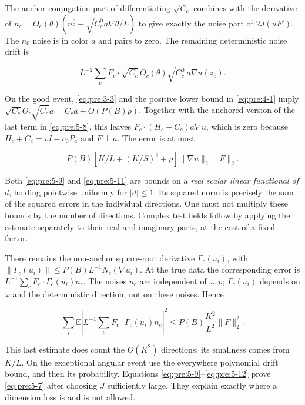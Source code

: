 The anchor-conjugation part of differentiating \(\sqrt{C_c}\) combines with the derivative of \(n_c=O_c(\theta)(n_c^0+\sqrt{C_c^0}a\nabla\theta/L)\) to give exactly the noise part of \(2J(uF')\). The \(n_0\) noise is in color \(a\) and pairs to zero. The remaining deterministic noise drift is

\begin{equation}
L^{-2}\sum_c F_c\cdot\sqrt{C_c}\,O_c(\theta)\sqrt{C_c^0}\,a\nabla u(z_c).
\label{eq:pre:5-10}
\end{equation}

On the good event, \eqref{eq:pre:3-3} and the positive lower bound in \eqref{eq:pre:4-1} imply
\(\sqrt{C_c}O_c\sqrt{C_c^0}a=C_ca+O(P(B)\rho)\).
Together with the anchored version of the last term in \eqref{eq:pre:5-8}, this leaves \(F_c\cdot(H_c+C_c)a\nabla u\), which is zero because \(H_c+C_c=vI-c_0P_a\) and \(F\perp a\). The error is at most

\begin{equation}
P(B)[K/L+(K/S)^2+\rho]\|\nabla u\|_2\|F\|_2.
\label{eq:pre:5-11}
\end{equation}

Both \eqref{eq:pre:5-9} and \eqref{eq:pre:5-11} are bounds on a \emph{real scalar linear functional of \(d\)}, holding pointwise uniformly for \(|d|\leq1\). Its squared norm is precisely the sum of the squared errors in the individual directions. One must not multiply these bounds by the number of directions. Complex test fields follow by applying the estimate separately to their real and imaginary parts, at the cost of a fixed factor.

There remains the non-anchor square-root derivative \(\Gamma_c(u_i)\), with
\(\|\Gamma_c(u_i)\|\leq P(B)L^{-1}N_c(\nabla u_i)\).
At the true data the corresponding error is
\(L^{-1}\sum_cF_c\cdot\Gamma_c(u_i)n_c\).
The noises \(n_c\) are independent of \(\omega,p\); \(\Gamma_c(u_i)\) depends on \(\omega\) and the deterministic direction, not on these noises. Hence

\begin{equation}
\sum_i\mathbb E\left|L^{-1}\sum_cF_c\cdot\Gamma_c(u_i)n_c\right|^2
\leq P(B)\frac{K^2}{L^2}\|F\|_2^2.
\label{eq:pre:5-12}
\end{equation}

This last estimate does count the \(O(K^2)\) directions; its smallness comes from \(K/L\). On the exceptional angular event use the everywhere polynomial drift bound, and then its probability. Equations \eqref{eq:pre:5-9}--\eqref{eq:pre:5-12} prove \eqref{eq:pre:5-7} after choosing \(J\) sufficiently large. They explain exactly where a dimension loss is and is not allowed.

